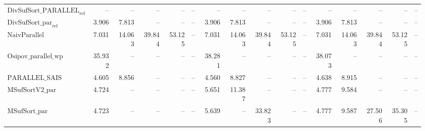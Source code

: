 \begin{table}
{\begin{tabular}{lrrrrrrrrrrrrrrr}
    $\text{DivSufSort\_PARALLEL}_{\text{ref}}$ & {\color{darkgray}--} & {\color{darkgray}--} & {\color{darkgray}--} & {\color{darkgray}--} & {\color{darkgray}--} & {\color{darkgray}--} & {\color{darkgray}--} & {\color{darkgray}--} & {\color{darkgray}--} & {\color{darkgray}--} & {\color{darkgray}--} & {\color{darkgray}--} & {\color{darkgray}--} & {\color{darkgray}--} & {\color{darkgray}--} \\
    $\text{DivSufSort\_par}_{\text{ref}}$ & {\color{green!60!black}3.906} & {\color{green!60!black}7.813} & {\color{darkgray}--} & {\color{darkgray}--} & {\color{darkgray}--} & {\color{green!60!black}3.906} & {\color{green!60!black}7.813} & {\color{darkgray}--} & {\color{darkgray}--} & {\color{darkgray}--} & {\color{green!60!black}3.906} & {\color{green!60!black}7.813} & {\color{darkgray}--} & {\color{darkgray}--} & {\color{darkgray}--} \\
    $\text{NaivParallel}$ & 7.031 & 14.063 & {\color{green!60!black}39.844} & {\color{green!60!black}53.125} & {\color{darkgray}--} & 7.031 & 14.063 & {\color{red}39.844} & {\color{green!60!black}53.125} & {\color{darkgray}--} & 7.031 & 14.063 & {\color{green!60!black}39.844} & {\color{red}53.125} & {\color{darkgray}--} \\
    $\text{Osipov\_parallel\_wp}$ & {\color{red}35.932} & {\color{darkgray}--} & {\color{darkgray}--} & {\color{darkgray}--} & {\color{darkgray}--} & {\color{red}38.281} & {\color{darkgray}--} & {\color{darkgray}--} & {\color{darkgray}--} & {\color{darkgray}--} & {\color{red}38.073} & {\color{darkgray}--} & {\color{darkgray}--} & {\color{darkgray}--} & {\color{darkgray}--} \\
    $\text{PARALLEL\_SAIS}$ & 4.605 & {\color{green!60!black}8.856} & {\color{darkgray}--} & {\color{darkgray}--} & {\color{darkgray}--} & {\color{green!60!black}4.560} & {\color{green!60!black}8.827} & {\color{darkgray}--} & {\color{darkgray}--} & {\color{darkgray}--} & 4.638 & 8.915 & {\color{darkgray}--} & {\color{darkgray}--} & {\color{darkgray}--} \\
    $\text{MSufSortV2\_par}$ & 4.724 & {\color{darkgray}--} & {\color{darkgray}--} & {\color{darkgray}--} & {\color{darkgray}--} & 5.651 & 11.387 & {\color{darkgray}--} & {\color{darkgray}--} & {\color{darkgray}--} & 4.777 & 9.584 & {\color{darkgray}--} & {\color{darkgray}--} & {\color{darkgray}--} \\
    $\text{MSufSort\_par}$ & 4.723 & {\color{darkgray}--} & {\color{darkgray}--} & {\color{darkgray}--} & {\color{darkgray}--} & 5.639 & {\color{darkgray}--} & {\color{green!60!black}33.823} & {\color{darkgray}--} & {\color{darkgray}--} & 4.777 & 9.587 & {\color{green!60!black}27.506} & {\color{green!60!black}35.305} & {\color{darkgray}--} \\

\end{tabular}}
\end{table}
